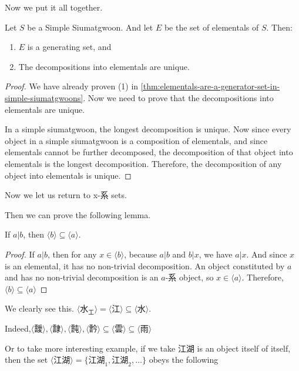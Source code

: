 Now we put it all together.
\begin{theorem}
    Let $S$ be a Simple Siumatgwoon. And let $E$ be the set of elementals of $S$. Then: 
    \begin{enumerate}
        \item $E$ is a generating set, and 
        \item The decompositions into elementals are unique.
    \end{enumerate}
\end{theorem}
\begin{proof}
    We have already proven (1) in \ref{thm:elementals-are-a-generator-set-in-simple-siumatgwoons}. Now we need to prove that the decompositions into elementals are unique.

    In a simple siumatgwoon, the longest decomposition is unique. Now since every object in a simple siumatgwoon is a composition of elementals, and since elementals cannot be further decomposed, the decomposition of that object into elementals is the longest decomposition. Therefore, the decomposition of any object into elementals is unique.
\end{proof}


Now we let us return to x-系 sets.



Then we can prove the following lemma. 
\begin{lemma}\label{lem:emergence-of-a-constituted-is-emergence-of-the-constituent}
    If $a|b$, then $ \langle b \rangle \subseteq \langle a \rangle$.
\end{lemma}
\begin{proof}
    If $a|b$, then for any $x\in \langle b \rangle$, because $a|b$ and $b|x$, we have $a|x$. And since $x$ is an elemental, it has no non-trivial decomposition. An object constituted by $a$ and has no non-trivial decomposition is an $a$-系 object, so $x \in \langle a \rangle$. Therefore, $\langle b \rangle \subseteq \langle a \rangle$
\end{proof}

We clearly see this. $
\langle \text{水}_\text{工} \rangle = \langle \text{江} \rangle \subseteq
\langle \text{水} \rangle$. 

Indeed,$\langle \text{靉} \rangle, \langle \text{霴} \rangle, \langle \text{霕} \rangle, \langle \text{霒} \rangle \subseteq \langle \text{雲} \rangle \subseteq \langle \text{雨} \rangle$

Or to take more interesting example, if we take $\text{江湖}$ is an object itself of itself, then the set $\langle \text{江湖} \rangle = \{\text{江湖}_{1}, \text{江湖}_{2}, \ldots\}$ obeys the following 


